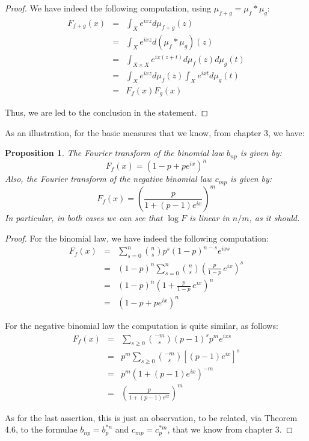 \documentclass[12pt]{amsbook}
\newtheorem{proposition}[theorem]{Proposition}
\begin{document}
\begin{proof}
We have indeed the following computation, using $\mu_{f+g}=\mu_f*\mu_g$:
\begin{eqnarray*}
F_{f+g}(x)
&=&\int_Xe^{ixz}d\mu_{f+g}(z)\\
&=&\int_Xe^{ixz}d(\mu_f*\mu_g)(z)\\
&=&\int_{X\times X}e^{ix(z+t)}d\mu_f(z)d\mu_g(t)\\
&=&\int_Xe^{ixz}d\mu_f(z)\int_Xe^{ixt}d\mu_g(t)\\
&=&F_f(x)F_g(x)
\end{eqnarray*}

Thus, we are led to the conclusion in the statement.
\end{proof}

As an illustration, for the basic measures that we know, from chapter 3, we have:

\begin{proposition}
The Fourier transform of the binomial law $b_{np}$ is given by:
$$F_f(x)=(1-p+pe^{ix})^n$$
Also, the Fourier transform of the negative binomial law $c_{mp}$ is given by:
$$F_f(x)=\left(\frac{p}{1+(p-1)e^{ix}}\right)^m$$
In particular, in both cases we can see that $\log F$ is linear in $n/m$, as it should.
\end{proposition}

\begin{proof}
For the binomial law, we have indeed the following computation:
\begin{eqnarray*}
F_f(x)
&=&\sum_{s=0}^n\binom{n}{s}p^s(1-p)^{n-s}e^{ixs}\\
&=&(1-p)^n\sum_{s=0}^n\binom{n}{s}\left(\frac{p}{1-p}\,e^{ix}\right)^s\\
&=&(1-p)^n\left(1+\frac{p}{1-p}\,e^{ix}\right)^n\\
&=&(1-p+pe^{ix})^n
\end{eqnarray*}

For the negative binomial law the computation is quite similar, as follows:
\begin{eqnarray*}
F_f(x)
&=&\sum_{s\geq0}\binom{-m}{s}(p-1)^sp^me^{ixs}\\
&=&p^m\sum_{s\geq0}\binom{-m}{s}[(p-1)e^{ix}]^s\\
&=&p^m(1+(p-1)e^{ix})^{-m}\\
&=&\left(\frac{p}{1+(p-1)e^{ix}}\right)^m
\end{eqnarray*}

As for the last assertion, this is just an observation, to be related, via Theorem 4.6, to the formulae $b_{np}=b_p^{*n}$ and $c_{mp}=c_p^{*m}$, that we know from chapter 3.
\end{proof}
\end{document}
